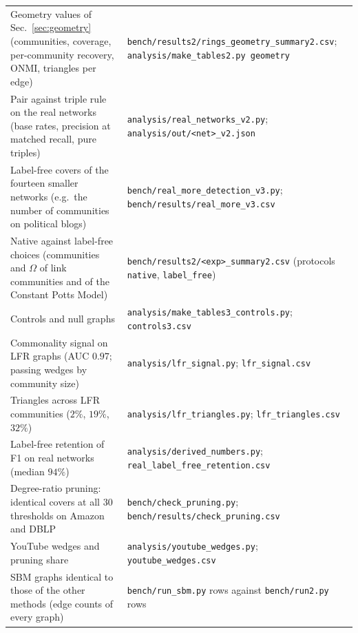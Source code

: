 \begin{table}[p]
\begin{ruledtabular}
\begin{tabular}{p{}p{}}
Geometry values of Sec.~\ref{sec:geometry} (communities, coverage, per-community recovery,
ONMI, triangles per edge) & \texttt{bench/results2/rings\_geometry\_summary2.csv};
\texttt{analysis/make\_tables2.py geometry} \\
Pair against triple rule on the real networks (base rates, precision at matched recall,
pure triples) & \texttt{analysis/real\_networks\_v2.py}; \texttt{analysis/out/<net>\_v2.json} \\
Label-free covers of the fourteen smaller networks (e.g.\ the number of communities on
political blogs) & \texttt{bench/real\_more\_detection\_v3.py};
\texttt{bench/results/real\_more\_v3.csv} \\
Native against label-free choices (communities and $\Omega$ of link communities and of the
Constant Potts Model) & \texttt{bench/results2/<exp>\_summary2.csv} (protocols
\texttt{native}, \texttt{label\_free}) \\
Controls and null graphs & \texttt{analysis/make\_tables3\_controls.py};
\texttt{controls3.csv} \\
Commonality signal on LFR graphs (AUC $0.97$; passing wedges by community size) &
\texttt{analysis/lfr\_signal.py}; \texttt{lfr\_signal.csv} \\
Triangles across LFR communities ($2\%$, $19\%$, $32\%$) & \texttt{analysis/lfr\_triangles.py};
\texttt{lfr\_triangles.csv} \\
Label-free retention of F1 on real networks (median $94\%$) & \texttt{analysis/derived\_numbers.py};
\texttt{real\_label\_free\_retention.csv} \\
Degree-ratio pruning: identical covers at all 30 thresholds on Amazon and DBLP &
\texttt{bench/check\_pruning.py}; \texttt{bench/results/check\_pruning.csv} \\
YouTube wedges and pruning share & \texttt{analysis/youtube\_wedges.py}; \texttt{youtube\_wedges.csv} \\
SBM graphs identical to those of the other methods (edge counts of every graph) &
\texttt{bench/run\_sbm.py} rows against \texttt{bench/run2.py} rows \\
\end{tabular}
\end{ruledtabular}
\end{table}
